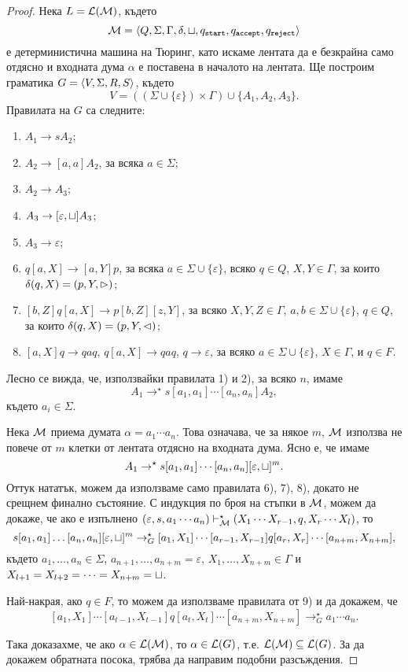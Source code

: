 \begin{proof}
  Нека $L = \mathcal{L}(\mathcal{M})$, където 
  \[\mathcal{M} = \langle{Q,\Sigma,\Gamma,\delta,\sqcup,q_{\texttt{start}},q_{\texttt{accept}}, q_{\texttt{reject}}}\rangle\] е детерминистична машина на Тюринг,
  като искаме лентата да е безкрайна само отдясно и входната дума $\alpha$ е
  поставена в началото на лентата.
  Ще построим граматика $G = \langle{V,\Sigma,R,S}\rangle$, където 
  \[V = ((\Sigma\cup\{\varepsilon\})\times\Gamma) \cup \{A_1,A_2,A_3\}.\]
  Правилата на $G$ са следните:
  \begin{enumerate}[1)]
  \item 
    $A_1 \to sA_2$;
  \item
    $A_2 \to [a,a]A_2$, за всяка $a\in\Sigma$;
  \item
    $A_2 \to A_3$;
  \item
    $A_3 \to [\varepsilon,\sqcup]A_3$;
  \item
    $A_3 \to \varepsilon$;
  \item
    $q[a,X] \to [a,Y]p$, за всяка $a \in \Sigma\cup\{\varepsilon\}$, всяко $q\in Q$, $X,Y \in\Gamma$, 
    за които $\delta(q,X) = (p,Y,\rhd)$;
  \item
    $[b,Z]q[a,X] \to p[b,Z][z,Y]$, за всяко $X,Y,Z \in \Gamma$, $a,b\in\Sigma\cup\{\varepsilon\}$, $q\in Q$,
    за които $\delta(q,X) = (p,Y,\lhd)$;
  \item
    $[a,X]q \to qaq$, $q[a,X] \to qaq$, $q \to \varepsilon$, за всяко $a\in\Sigma\cup\{\varepsilon\}$, $X\in\Gamma$,
    и $q \in F$.
  \end{enumerate}
  
  Лесно се вижда, че, използвайки правилата 1) и 2), за всяко $n$, имаме
  \[A_1 \to^\star s[a_1,a_1]\cdots[a_n,a_n]A_2,\]
  където $a_i \in \Sigma$.

  Нека $\mathcal{M}$ приема думата $\alpha = a_1\cdots a_n$.
  Това означава, че за някое $m$, $\mathcal{M}$ използва не повече от $m$ клетки от лентата отдясно на входната дума.
  Ясно е, че имаме
  \[A_1 \to^\star s[a_1,a_1]\cdots[a_n,a_n][\varepsilon,\sqcup]^m.\]
  Оттук нататък, можем да използваме само правилата 6), 7), 8), докато не срещнем финално състояние.
  С индукция по броя на стъпки в $\mathcal{M}$, можем да докаже, че ако е изпълнено
  $(\varepsilon,s,a_1\cdots a_n) \vdash^\star_{\mathcal{M}} (X_1\cdots X_{r-1},q,X_r\cdots X_l)$, 
  то \[s[a_1,a_1]\dots[a_n,a_n][\varepsilon,\sqcup]^m \rightarrow^\star_G [a_1,X_1]\cdots[a_{r-1},X_{r-1}]q[a_r,X_r]\cdots[a_{n+m},X_{n+m}],\]
  където $a_1,\dots,a_n \in \Sigma$, $a_{n+1},\dots,a_{n+m} = \varepsilon$, $X_1,\dots,X_{n+m} \in \Gamma$ и
  $X_{l+1} = X_{l+2} = \dots = X_{n+m} = \sqcup$.
  
  Най-накрая, ако $q \in F$, то можем да използваме правилата от 9) и да докажем, че
  \[[a_1,X_1]\cdots[a_{t-1},X_{t-1}]q[a_t,X_t]\cdots[a_{n+m},X_{n+m}] \rightarrow^\star_G a_1\cdots a_n.\]
  
  Така доказахме, че ако $\alpha \in \mathcal{L}(\mathcal{M})$, то $\alpha \in \mathcal{L}(G)$, т.е. $\mathcal{L}(\mathcal{M}) \subseteq \mathcal{L}(G)$.
  За да докажем обратната посока, трябва да направим подобни разсъждения.
\end{proof}

